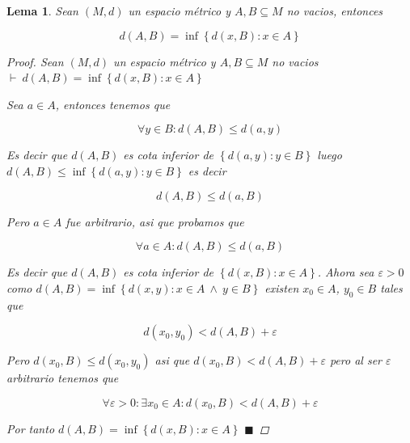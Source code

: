 \documentclass[oneside]{book} %
\theoremstyle{Teorema}
\newtheorem{Lema}[Definicion]{Lema}
\theoremstyle{Ejemplos}
\theoremstyle{[Obs]}
\renewcommand{\{}{\left\lbrace} %
\renewcommand{\}}{\right\rbrace} %
\newcommand{\y}{\ \wedge\ } %
\renewcommand{\sc}{\subseteq} %
\renewcommand{\qed}{$\blacksquare$} %
\newcommand{\pd}{$\vdash\ $} %
\begin{document}
			\begin{Lema}\setlength{\parindent}{0em}
				
				Sean $(M, d)$ un espacio métrico y $A, B \sc M$ no vacios, entonces 

				\[ d(A, B) = \inf\{ d(x, B) : x \in A \} \] 

				\begin{proof}
					
					Sean $(M, d)$ un espacio métrico y $A, B \sc M$ no vacios \\
					\pd $d(A, B) = \inf\{ d(x, B) : x \in A \}$

					Sea $a \in A$, entonces tenemos que 
					
					\[ \forall y \in B: d(A, B) \leq d(a, y) \]

					Es decir que $d(A, B)$ es cota inferior de $\{ d(a, y) : y \in B \}$ luego $d(A, B) \leq \inf\{ d(a, y) : y \in B \}$ es decir

					\[ d(A, B) \leq d(a, B) \]

					Pero $a \in A$ fue arbitrario, asi que probamos que 

					\[ \forall a \in A : d(A, B) \leq d(a, B) \]

					Es decir que $d(A, B)$ es cota inferior de $\{ d(x, B) : x \in A \}$. Ahora sea $\varepsilon > 0$ como $d(A, B) = \inf\{ d(x, y) : x \in A \y y \in B \}$ existen $x_0 \in A$, $y_0 \in B$ tales que 

					\[ d(x_0, y_0) < d(A, B) + \varepsilon \]

					Pero $d(x_0, B) \leq d(x_0, y_0)$ asi que $d(x_0, B) < d(A, B) + \varepsilon$ pero al ser $\varepsilon$ arbitrario tenemos que 

					\[ \forall \varepsilon > 0 : \exists x_0 \in A : d(x_0, B) < d(A, B) + \varepsilon \]

					Por tanto $d(A, B) = \inf\{ d(x, B) : x \in A \}$ \qed

				\end{proof}

			\end{Lema}
\end{document}
